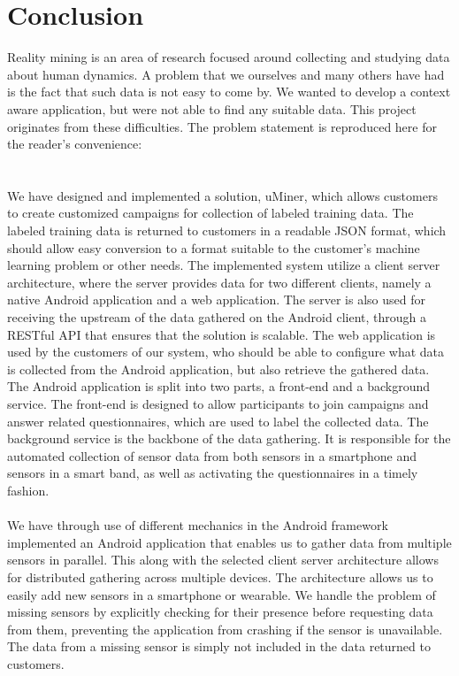 
\chapter{Conclusion}
\label{cha:conclusion}
Reality mining is an area of research focused around collecting and studying data about human dynamics. A problem that we ourselves and many others have had is the fact that such data is not easy to come by. We wanted to develop a context aware application, but were not able to find any suitable data. This project originates from these difficulties. The problem statement is reproduced here for the reader's convenience:
\\

\\\\
We have designed and implemented a solution, uMiner, which allows customers to create customized campaigns for collection of labeled training data. The labeled training data is returned to customers in a readable JSON format, which should allow easy conversion to a format suitable to the customer's machine learning problem or other needs. The implemented system utilize a client server architecture, where the server provides data for two different clients, namely a native Android application and a web application. The server is also used for receiving the upstream of the data gathered on the Android client, through a RESTful API that ensures that the solution is scalable. The web application is used by the customers of our system, who should be able to configure what data is collected from the Android application, but also retrieve the gathered data. The Android application is split into two parts, a front-end and a background service. The front-end is designed to allow participants to join campaigns and answer related questionnaires, which are used to label the collected data. The background service is the backbone of the data gathering. It is responsible for the automated collection of sensor data from both sensors in a smartphone and sensors in a smart band, as well as activating the questionnaires in a timely fashion.  
\\\\
We have through use of different mechanics in the Android framework implemented an Android application that enables us to gather data from multiple sensors in parallel. This along with the selected client server architecture allows for distributed gathering across multiple devices. The architecture allows us to easily add new sensors in a smartphone or wearable. We handle the problem of missing sensors by explicitly checking for their presence before requesting data from them, preventing the application from crashing if the sensor is unavailable. The data from a missing sensor is simply not included in the data returned to customers.
